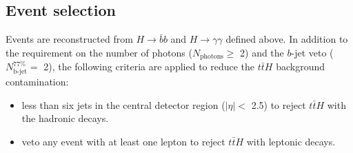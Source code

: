 
\subsection{Event selection}
\label{HHyybb:ObjEvt:Evt}
Events are reconstructed from $H\to\bar{b}b$ and $H\to\gamma\gamma$ defined above. In addition to the requirement on the number of photons ($N_{\text{photons}} \geq $ 2) and the $b$-jet veto ($N_{\text{b-jet}}^{77\%} = $ 2), the following criteria are applied to reduce the $t\bar{t}H$ background contamination: 

\begin{itemize}
    \protect
    \item less than six jets in the central detector region ($|\eta| < $ 2.5) to reject $t\bar{t}H$ with the hadronic decays. 
    \item veto any event with at least one lepton to reject $t\bar{t}H$ with leptonic decays.  
\end{itemize}


